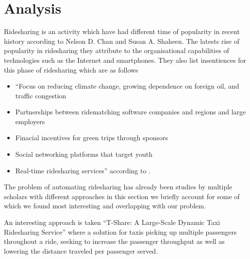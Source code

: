 \section{Analysis}
Ridesharing is an activity which have had different time of popularity in recent history according to Nelson D. Chan and Susan A. Shaheen\cite{doi:10.1080/01441647.2011.621557}.
The latests rise of popularity in ridesharing they attribute to the organisational capabilities of technologies such as the Internet and smartphones.
They also list insentiences for this phase of ridesharing which are as follows 
\begin{itemize}
  \item ``Focus on reducing climate change, growing dependence on foreign oil, and traffic congestion
  \item Partnerships between ridematching software companies and regions and large employers
  \item Finacial incentives for green trips through sponsors
  \item Social networking platforms that target youth
  \item Real-time ridesharing services'' according to \cite{doi:10.1080/01441647.2011.621557}.
\end{itemize}


The problem of automating ridesharing has already been studies by multiple scholars with different approaches in this section we briefly account for some of which we found most interesting and overlapping with our problem. 

An interesting approach is taken ``T-Share: A Large-Scale Dynamic Taxi Ridesharing Service'' where a solution for taxis picking up multiple passengers throughout a ride, seeking to increase the passenger throughput as well as lowering the distance traveled per passenger served\cite{ShuoMa2013}.